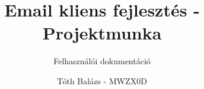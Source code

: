 \documentclass{report}
\title{Email kliens fejlesztés - Projektmunka}
\subtitle{Felhasználói dokumentáció}
\author{Tóth Balázs - MWZX0D}
\date{}
\begin{document}
\maketitle

\tableofcontents









\listoflistings
\listoffigures
\listoftables
\end{document}
